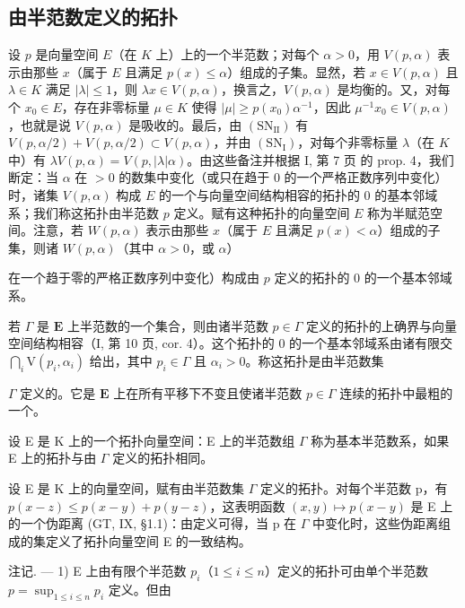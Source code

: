 \subsection{由半范数定义的拓扑}

设 \(p\) 是向量空间 \(E\)（在 \(K\) 上）上的一个半范数；对每个 \(\alpha > 0\)，用 \(V(p, \alpha)\) 表示由那些 \(x\)（属于 \(E\) 且满足 \(p(x) \leqslant \alpha\)）组成的子集。显然，若 \(x \in V(p, \alpha)\) 且 \(\lambda \in K\) 满足 \(|\lambda| \leqslant 1\)，则 \(\lambda x \in V(p, \alpha)\)，换言之，\(V(p, \alpha)\) 是均衡的。又，对每个 \(x_0 \in E\)，存在非零标量 \(\mu \in K\) 使得 \(|\mu| \geqslant p(x_0) \alpha^{-1}\)，因此 \(\mu^{-1}x_0 \in V(p, \alpha)\)，也就是说 \(V(p, \alpha)\) 是吸收的。最后，由 \((\mathrm{SN}_{\mathrm{II}})\) 有 \(V(p, \alpha/2) + V(p, \alpha/2) \subset V(p, \alpha)\)，并由 \((\mathrm{SN}_{\mathrm{I}})\)，对每个非零标量 \(\lambda\)（在 \(K\) 中）有 \(\lambda V(p, \alpha) = V(p, |\lambda| \alpha)\)。由这些备注并根据 I, 第 7 页 的 prop. 4，我们断定：当 \(\alpha\) 在 \(> 0\) 的数集中变化（或只在趋于 0 的一个严格正数序列中变化）时，诸集 \(V(p, \alpha)\) 构成 \(E\) 的一个与向量空间结构相容的拓扑的 0 的基本邻域系；我们称这拓扑由半范数 \(p\) 定义。赋有这种拓扑的向量空间 \(E\) 称为半赋范空间。注意，若 \(W(p, \alpha)\) 表示由那些 \(x\)（属于 \(E\) 且满足 \(p(x) < \alpha\)）组成的子集，则诸 \(W(p, \alpha)\)（其中 \(\alpha > 0\)，或 \(\alpha\)）

在一个趋于零的严格正数序列中变化）构成由 \(p\) 定义的拓扑的 0 的一个基本邻域系。

若 \(\Gamma\) 是 \(\mathbf{E}\) 上半范数的一个集合，则由诸半范数 \(p \in \Gamma\) 定义的拓扑的上确界与向量空间结构相容（I, 第 10 页, cor. 4）。这个拓扑的 0 的一个基本邻域系由诸有限交 \(\bigcap_{i} \mathrm{V}(p_i, \alpha_i)\) 给出，其中 \(p_i \in \Gamma\) 且 \(\alpha_i > 0\)。称这拓扑是由半范数集

\(\Gamma\) 定义的。它是 \(\mathbf{E}\) 上在所有平移下不变且使诸半范数 \(p \in \Gamma\) 连续的拓扑中最粗的一个。

设 E 是 K 上的一个拓扑向量空间：E 上的半范数组 \(\Gamma\) 称为基本半范数系，如果 E 上的拓扑与由 \(\Gamma\) 定义的拓扑相同。

设 E 是 K 上的向量空间，赋有由半范数集 \(\Gamma\) 定义的拓扑。对每个半范数 p，有 \(p(x - z) \leqslant p(x - y) + p(y - z)\)，这表明函数 \((x, y) \mapsto p(x - y)\) 是 E 上的一个伪距离 (GT, IX, §1.1)：由定义可得，当 p 在 \(\Gamma\) 中变化时，这些伪距离组成的集定义了拓扑向量空间 E 的一致结构。

注记. --- 1) E 上由有限个半范数 \(p_i\)（\(1 \leqslant i \leqslant n\)）定义的拓扑可由单个半范数 \(p = \sup_{1 \leqslant i \leqslant n} p_i\) 定义。但由

